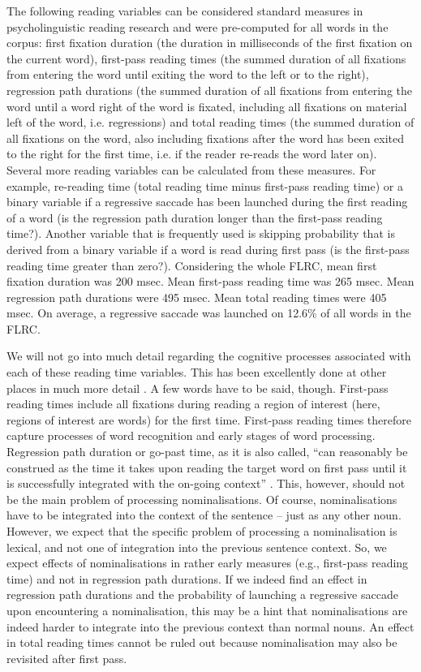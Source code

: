 \documentclass[output=paper]{langsci/langscibook}
\begin{document}
The following reading variables can be considered standard measures in psycholinguistic reading research and were pre-computed for all words in the corpus: first fixation duration (the duration in milliseconds of the first fixation on the current word), first-pass reading times (the summed duration of all fixations from entering the word until exiting the word to the left or to the right), regression path durations (the summed duration of all fixations from entering the word until a word right of the word is fixated, including all fixations on material left of the word, i.e. regressions) and total reading times (the summed duration of all fixations on the word, also including fixations after the word has been exited to the right for the first time, i.e. if the reader re-reads the word later on). Several more reading variables can be calculated from these measures. For example, re-reading time (total reading time minus first-pass reading time) or a binary variable if a regressive saccade has been launched during the first reading of a word (is the regression path duration longer than the first-pass reading time?). Another variable that is frequently used is skipping probability that is derived from a binary variable if a word is read during first pass (is the first-pass reading time greater than zero?). Considering the whole FLRC, mean first fixation duration was 200 msec. Mean first-pass reading time was 265 msec. Mean regression path durations were 495 msec. Mean total reading times were 405 msec. On average, a regressive saccade was launched on 12.6\% of all words in the FLRC. 

We will not go into much detail regarding the cognitive processes associated with each of these reading time variables. This has been excellently done at other places in much more detail \citep{Clifton2007, Hyona2003, Rayner2006}. A few words have to be said, though. First-pass reading times include all fixations during reading a region of interest (here, regions of interest are words) for the first time. First-pass reading times therefore capture processes of word recognition and early stages of word processing. Regression path duration or go-past time, as it is also called, “can reasonably be construed as the time it takes upon reading the target word on first pass until it is successfully integrated with the on-going context” \citep[p. 620]{Rayner2006}. This, however, should not be the main problem of processing nominalisations. Of course, nominalisations have to be integrated into the context of the sentence – just as any other noun. However, we expect that the specific problem of processing a nominalisation is lexical, and not one of integration into the previous sentence context. So, we expect effects of nominalisations in rather early measures (e.g., first-pass reading time) and not in regression path durations. If we indeed find an effect in regression path durations and the probability of launching a regressive saccade upon encountering a nominalisation, this may be a hint that nominalisations are indeed harder to integrate into the previous context than normal nouns. An effect in total reading times cannot be ruled out because nominalisation may also be revisited after first pass.
\end{document}
